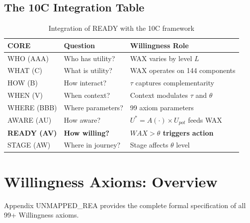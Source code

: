 \subsection{The 10C Integration Table}

\begin{table}[h]
\centering
\begin{tabular}{lll}
\toprule
\textbf{CORE} & \textbf{Question} & \textbf{Willingness Role} \\
\midrule
WHO (AAA) & Who has utility? & WAX varies by level $L$ \\
WHAT (C) & What is utility? & WAX operates on 144 components \\
HOW (B) & How interact? & $\tau$ captures complementarity \\
WHEN (V) & When context? & Context modulates $\tau$ and $\theta$ \\
WHERE (BBB) & Where parameters? & 99 axiom parameters \\
AWARE (AU) & How aware? & $U^* = A(\cdot) \times U_{pot}$ feeds WAX \\
\textbf{READY (AV)} & \textbf{How willing?} & \textbf{$WAX > \theta$ triggers action} \\
STAGE (AW) & Where in journey? & Stage affects $\theta$ level \\
\bottomrule
\end{tabular}
\caption{Integration of READY with the 10C framework}
\label{tab:10c-ready-integration}
\end{table}



\section{Willingness Axioms: Overview}
\label{sec:12-axioms}


Appendix UNMAPPED_REA provides the complete formal specification of all 99+ Willingness axioms.

